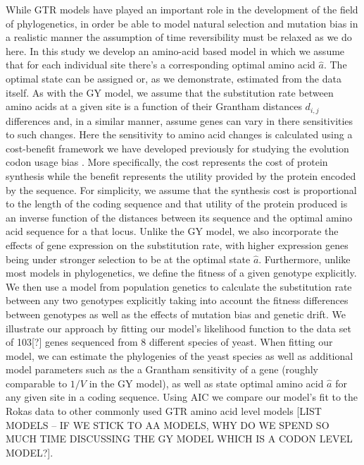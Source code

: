 \documentclass[13pt]{article}
\begin{document}
While GTR models have played an important role in the development of the field of phylogenetics,  in order be able to model natural selection and mutation bias in a realistic manner the assumption of time reversibility must be relaxed as we do here.
In this study we develop an amino-acid based model in which we assume that for each individual site there's a corresponding optimal amino acid $\hat{a}$.
The optimal state can be assigned or, as we demonstrate, estimated from the data itself.
As with the GY model, we assume that the substitution rate between amino acids at a given site is a function of their Grantham distances $d_{i,j}$ differences and, in a similar manner, assume genes can vary in there sensitivities to such changes.
Here the sensitivity to amino acid changes is calculated using a cost-benefit framework we have developed previously for studying the evolution codon usage bias \cite{Gilchrist07, GilchristEtAl09,ShahAndGilchrist11}.
More specifically, the cost represents the cost of protein synthesis while the benefit represents the utility provided by the protein encoded by the sequence.
For simplicity, we assume that the synthesis cost is proportional to the length of the coding sequence and that utility of the protein produced is an inverse function of the distances between its sequence and the optimal amino acid sequence for a that locus.
Unlike the GY model, we also incorporate the effects of gene expression on the substitution rate, with higher expression genes being under stronger selection to be at the optimal state $\hat{a}$.
Furthermore, unlike most models in phylogenetics, we define the fitness of a given genotype explicitly.
We then use a model from population genetics to calculate the substitution rate between any two genotypes explicitly taking into account the fitness differences between genotypes as well as the effects of mutation bias and genetic drift.
We illustrate our approach by fitting our model's likelihood function to the \citet{RokasEtAl03} data set of 103[?] genes sequenced from 8 different species of yeast.
When fitting our model, we can estimate the phylogenies of the yeast species as well as additional model parameters such as the a Grantham sensitivity of a gene (roughly comparable to $1/V$ in the GY model), as well as state optimal amino acid $\hat{a}$ for any given site in a coding sequence.
Using AIC we compare our model's fit to the Rokas data to other commonly used GTR amino acid level models [LIST MODELS -- IF WE STICK TO AA MODELS, WHY DO WE SPEND SO MUCH TIME DISCUSSING THE GY MODEL WHICH IS A CODON LEVEL MODEL?].
\end{document}
